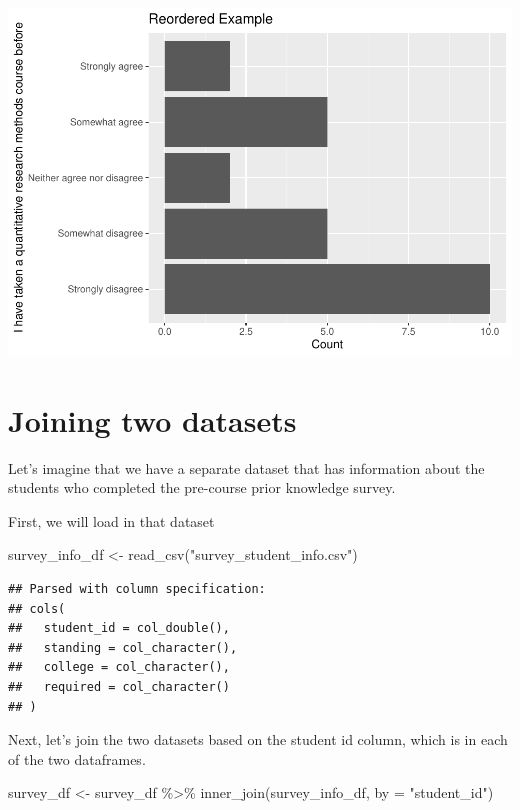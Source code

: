 \documentclass[
]{book}
\newenvironment{Shaded}{\begin{snugshade}}{\end{snugshade}}
\newcommand{\AttributeTok}[1]{\textcolor[rgb]{0.77,0.63,0.00}{#1}}
\newcommand{\FunctionTok}[1]{\textcolor[rgb]{0.00,0.00,0.00}{#1}}
\newcommand{\NormalTok}[1]{#1}
\newcommand{\OtherTok}[1]{\textcolor[rgb]{0.56,0.35,0.01}{#1}}
\newcommand{\SpecialCharTok}[1]{\textcolor[rgb]{0.00,0.00,0.00}{#1}}
\newcommand{\StringTok}[1]{\textcolor[rgb]{0.31,0.60,0.02}{#1}}
\begin{document}
\includegraphics{test_course_notes_files/figure-latex/unnamed-chunk-32-1.pdf}

\hypertarget{joining-two-datasets}{%
\section{Joining two datasets}\label{joining-two-datasets}}

Let's imagine that we have a separate dataset that has information about the students who completed the pre-course prior knowledge survey.

First, we will load in that dataset

\begin{Shaded}
\begin{Highlighting}[]
\NormalTok{survey\_info\_df }\OtherTok{\textless{}{-}} \FunctionTok{read\_csv}\NormalTok{(}\StringTok{"survey\_student\_info.csv"}\NormalTok{)}
\end{Highlighting}
\end{Shaded}

\begin{verbatim}
## Parsed with column specification:
## cols(
##   student_id = col_double(),
##   standing = col_character(),
##   college = col_character(),
##   required = col_character()
## )
\end{verbatim}

Next, let's join the two datasets based on the student id column, which is in each of the two dataframes.

\begin{Shaded}
\begin{Highlighting}[]
\NormalTok{survey\_df }\OtherTok{\textless{}{-}}\NormalTok{ survey\_df }\SpecialCharTok{\%\textgreater{}\%} \FunctionTok{inner\_join}\NormalTok{(survey\_info\_df, }\AttributeTok{by =} \StringTok{"student\_id"}\NormalTok{)}
\end{Highlighting}
\end{Shaded}
\end{document}
